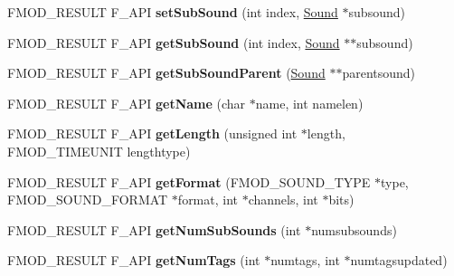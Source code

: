 \begin{DoxyCompactItemize}
\item 
\mbox{\label{classFMOD_1_1Sound_ab326892db719b2e98dc0d14b91b0a17c}} 
F\+M\+O\+D\+\_\+\+R\+E\+S\+U\+LT F\+\_\+\+A\+PI {\bfseries set\+Sub\+Sound} (int index, \hyperlink{classFMOD_1_1Sound}{Sound} $\ast$subsound)
\item 
\mbox{\label{classFMOD_1_1Sound_ae1f9dd4b19f536a11850961348d6210f}} 
F\+M\+O\+D\+\_\+\+R\+E\+S\+U\+LT F\+\_\+\+A\+PI {\bfseries get\+Sub\+Sound} (int index, \hyperlink{classFMOD_1_1Sound}{Sound} $\ast$$\ast$subsound)
\item 
\mbox{\label{classFMOD_1_1Sound_a0634bd4977fc537bd7a497aaf380009a}} 
F\+M\+O\+D\+\_\+\+R\+E\+S\+U\+LT F\+\_\+\+A\+PI {\bfseries get\+Sub\+Sound\+Parent} (\hyperlink{classFMOD_1_1Sound}{Sound} $\ast$$\ast$parentsound)
\item 
\mbox{\label{classFMOD_1_1Sound_a448ce4d402d03d76c79f289565cae2c2}} 
F\+M\+O\+D\+\_\+\+R\+E\+S\+U\+LT F\+\_\+\+A\+PI {\bfseries get\+Name} (char $\ast$name, int namelen)
\item 
\mbox{\label{classFMOD_1_1Sound_a3f0b77ce74332b1f358816eedfc6ca02}} 
F\+M\+O\+D\+\_\+\+R\+E\+S\+U\+LT F\+\_\+\+A\+PI {\bfseries get\+Length} (unsigned int $\ast$length, F\+M\+O\+D\+\_\+\+T\+I\+M\+E\+U\+N\+IT lengthtype)
\item 
\mbox{\label{classFMOD_1_1Sound_a3b74a166eab897c4b01795aac95eceb1}} 
F\+M\+O\+D\+\_\+\+R\+E\+S\+U\+LT F\+\_\+\+A\+PI {\bfseries get\+Format} (F\+M\+O\+D\+\_\+\+S\+O\+U\+N\+D\+\_\+\+T\+Y\+PE $\ast$type, F\+M\+O\+D\+\_\+\+S\+O\+U\+N\+D\+\_\+\+F\+O\+R\+M\+AT $\ast$format, int $\ast$channels, int $\ast$bits)
\item 
\mbox{\label{classFMOD_1_1Sound_ade84503ee47f6c08a1116899c4b59ab7}} 
F\+M\+O\+D\+\_\+\+R\+E\+S\+U\+LT F\+\_\+\+A\+PI {\bfseries get\+Num\+Sub\+Sounds} (int $\ast$numsubsounds)
\item 
\mbox{\label{classFMOD_1_1Sound_af676bc0be9a87128c8b09f104a4ce31c}} 
F\+M\+O\+D\+\_\+\+R\+E\+S\+U\+LT F\+\_\+\+A\+PI {\bfseries get\+Num\+Tags} (int $\ast$numtags, int $\ast$numtagsupdated)

\end{DoxyCompactItemize}

